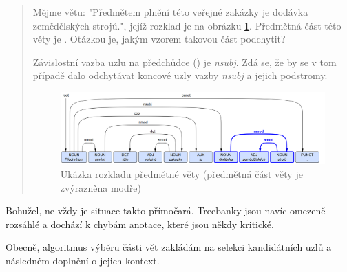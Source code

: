 \documentclass[thesis=M,czech]{FITthesis}[2019/12/23]
\newenvironment{example}{\begin{adjustwidth}{1cm}{}}{\end{adjustwidth}}
\begin{document}
\begin{quote}
    Mějme větu: "Předmětem plnění této veřejné zakázky je dodávka zemědělských strojů.", jejíž rozklad je na obrázku \ref{fig:decompositionexample}. Předmětná část této věty je . Otázkou je, jakým vzorem takovou část podchytit?
    
    Závislostní vazba uzlu  na předchůdce () je \textit{nsubj}. Zdá se, že by se v tom případě dalo odchytávat koncové uzly vazby \textit{nsubj} a jejich podstromy.
    
    \begin{figure}\centering
    	\includegraphics[width=1\textwidth]{images/decomposition_example.PNG}
    	\caption[Ukázka rozkladu předmětné věty]{Ukázka rozkladu předmětné věty (předmětná část věty je zvýrazněna modře)}\label{fig:decompositionexample}
    \end{figure}
\end{quote}

Bohužel, ne vždy je situace takto přímočará. Treebanky jsou navíc omezeně rozsáhlé a dochází k chybám anotace, které jsou někdy kritické.

Obecně, algoritmus výběru části vět zakládám na selekci kandidátních uzlů a následném doplnění o jejich kontext.
\end{document}
